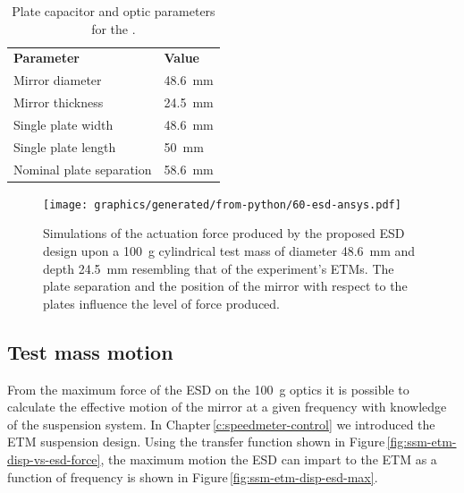\begin{table}
  \centering
  \begin{tabular}{ll}
    \textbf{Parameter}   & \textbf{Value} \\
    Mirror diameter      & \SI{48.6}{\milli\meter} \\
    Mirror thickness     & \SI{24.5}{\milli\meter} \\
    Single plate width   & \SI{48.6}{\milli\meter} \\
    Single plate length  & \SI{50}{\milli\meter} \\
    Nominal plate separation & \SI{58.6}{\milli\meter} \\
  \end{tabular}
  \caption[Plate capacitor and optic parameters for the \SSMEXPT{}]{\label{tab:ssm-esd-parameters}Plate capacitor and optic parameters for the \SSMEXPT{}.}
\end{table}

\begin{figure}
  \centering
  \texttt{[image: graphics/generated/from-python/60-esd-ansys.pdf]}
  \caption[Simulations of the actuation force produced by the proposed electrostatic drive design]{\label{fig:ssm-esd-ansys}Simulations of the actuation force produced by the proposed \gls{ESD} design upon a \SI{100}{\gram} cylindrical test mass of diameter \SI{48.6}{\milli\meter} and depth \SI{24.5}{\milli\meter} resembling that of the \SSM experiment's ETMs. The plate separation and the position of the mirror with respect to the plates influence the level of force produced. }
\end{figure}

\subsection{Test mass motion}
From the maximum force of the \gls{ESD} on the \SI{100}{\gram} optics it is possible to calculate the effective motion of the mirror at a given frequency with knowledge of the suspension system. In Chapter\,\ref{c:speedmeter-control} we introduced the \gls{ETM} suspension design. Using the transfer function shown in Figure\,\ref{fig:ssm-etm-disp-vs-esd-force}, the maximum motion the \gls{ESD} can impart to the \gls{ETM} as a function of frequency is shown in Figure\,\ref{fig:ssm-etm-disp-esd-max}.


